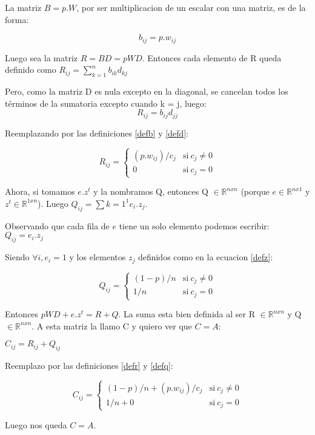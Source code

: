 La matriz $B = p.W$, por ser multiplicacion de un escalar con una matriz, es de la forma:

\begin{equation}
	\label{defb}
	b_{ij} = p.w_{ij}
\end{equation}

Luego sea la matriz $R = BD = pWD$. Entonces cada elemento de R queda definido como $R_{ij} = \sum_{k=1}^n b_{ik} d_{kj}$

Pero, como la matriz D es nula excepto en la diagonal, se cancelan todos los términos de la sumatoria excepto cuando k = j, luego: 
\begin{equation}
R_{ij} = b_{ij} d_{jj}
\end{equation}

Reemplazando por las definiciones \ref{defb} y \ref{defd}: 

\begin{equation}
	\label{defr}
    R_{ij} = \left\{
            \begin{array}{ll}
                 (p.w_{ij})/c_j & \mathrm{si\ } c_j \neq 0 \\
                 0              & \mathrm{si\ } c_j = 0
            \end{array}
        \right.
\end{equation}

Ahora, si tomamos $e.z^t$ y la nombramos Q, entonces Q $\in \mathbb{R}^{nxn}$ (porque $e \in \mathbb{R}^{nx1}$ y $z^t \in \mathbb{R}^{1xn}$). Luego $Q_{ij} = \sum{k=1}^1e_i.z_j$.

Observando que cada fila de $e$ tiene un solo elemento podemos escribir:  
$Q_{ij} = e_i.z_j$

Siendo $\forall i, e_i = 1$ y los elementos $z_j$ definidos como en la ecuacion \ref{defz}:

\begin{equation}
	\label{defq}
    Q_{ij} = \left\{
            \begin{array}{ll}
                 (1-p)/n      & \mathrm{si\ } c_j \neq 0 \\
                 1/n & \mathrm{si\ } c_j = 0
            \end{array}
        \right.
\end{equation}

Entonces $pWD + e.z^t = R + Q$. La suma esta bien definida al ser R $\in \mathbb{R}^{nxn}$ y Q $\in \mathbb{R}^{nxn}$. A esta matriz la llamo C y quiero ver que $C=A$:

$C_{ij} = R_{ij} + Q_{ij}$

Reemplazo por las definiciones \eqref{defr} y \eqref{defq}:

\begin{equation}
	\label{defc}
    C_{ij} = \left\{
            \begin{array}{ll}
                 (1-p)/n + (p.w_{ij})/c_j & \mathrm{si\ } c_j \neq 0 \\
                 1/n + 0                  & \mathrm{si\ } c_j = 0
            \end{array}
        \right.
\end{equation}

Luego nos queda $C=A$.
